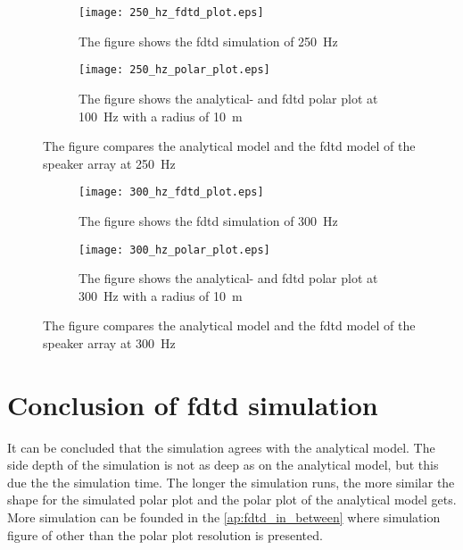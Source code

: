 \begin{figure}[H]
\centering
\begin{subfigure}[htbp]{0.55\textwidth}
		\texttt{[image: 250\_hz\_fdtd\_plot.eps]}
		\caption{The figure shows the \gls{fdtd} simulation of \SI{250}{\hertz}}
		\label{fig:fdtd_250_Hz}
\end{subfigure}
\begin{subfigure}[htbp]{0.35\textwidth}
		\texttt{[image: 250\_hz\_polar\_plot.eps]}
		\caption{The figure shows the analytical- and \gls{fdtd} polar plot at \SI{100}{\hertz} with a radius of \SI{10}{\meter}}
		\label{fig:polar_250_Hz}
\end{subfigure} 
\caption{The figure compares the analytical model and the \gls{fdtd} model of the speaker array at \SI{250}{\hertz}}
\end{figure}


\begin{figure}[H]
\centering
\begin{subfigure}[htbp]{0.55\textwidth}
		\texttt{[image: 300\_hz\_fdtd\_plot.eps]}
		\caption{The figure shows the \gls{fdtd} simulation of \SI{300}{\hertz}}
		\label{fig:fdtd_300_Hz}
\end{subfigure}
\begin{subfigure}[htbp]{0.35\textwidth}
		\texttt{[image: 300\_hz\_polar\_plot.eps]}
		\caption{The figure shows the analytical- and \gls{fdtd} polar plot at \SI{300}{\hertz} with a radius of \SI{10}{\meter}}
		\label{fig:polar_300_Hz}
\end{subfigure} 
\caption{The figure compares the analytical model and the \gls{fdtd} model of the speaker array at \SI{300}{\hertz}}
\end{figure}

\section{Conclusion of \gls{fdtd} simulation}
It can be concluded that the simulation agrees with the analytical model. The side depth of the simulation is not as deep as on the analytical model, but this due the the simulation time. The longer the simulation runs, the more similar the shape for the simulated polar plot and the polar plot of the analytical model gets. More simulation can be founded in the \autoref{ap:fdtd_in_between} where simulation figure of other than the polar plot resolution is presented.


